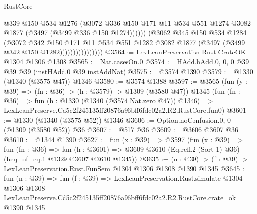\begin{lexlean}{RustCore}
\begin{coremodule}
                                  @339
                                  @150
                                  @534
                                  @1276
                                  (@3072
                                    @336
                                    @150
                                    @171
                                    @11
                                    @534
                                    @551
                                    @1274
                                    @3082
                                    @1877
                                    (@3497 (@3499 @336 @150 @1274))))))
                            (@3062
                              @345
                              @150
                              @534
                              @1284
                              (@3072
                                @342
                                @150
                                @171
                                @11
                                @534
                                @551
                                @1282
                                @3082
                                @1877
                                (@3497 (@3499 @342 @150 @1282))))))))))))))))
@3564 := LexLeanPreservation.Rust.CrateOK @1304 @1306 @1308
@3565 := Nat.casesOn.{0}
@3574 := HAdd.hAdd.{0, 0, 0} @39 @39 @39 (instHAdd.{0} @39 instAddNat)
@3575 := @3574 @1390
@3579 := @1330 (@1340 (@3575 @47)) @1346
@3580 := @3574 @1388
@3597 := @3565
    (fun (y : @39) => (fn : @36) -> (h : @3579) -> @1309 (@3580 @47))
    @1345
    (fun (fn : @36) =>
    fun (h : @1330 (@1340 (@3574 Nat.zero @47)) @1346) =>
    LexLeanPreserve.Cd5c2f245135ff20876a96bff6fdc02a2.R2.RustCore.fun0)
@3601 := @1330 (@1340 (@3575 @52)) @1346
@3606 := Option.noConfusion.{0, 0} (@1309 (@3580 @52)) @36
@3607 := @517 @36
@3609 := @3606 @3607 @36
@3610 := @1344 @1390
@3627 := fun (x : @39) =>
  @3597
    (fun (x : @39) =>
    fun (fn : @36) =>
    fun (h : @3601) =>
    @3609 @3610 (Eq.refl.{2} (Sort 1) @36) (heq_of_eq.{1} @1329 @3607 @3610 @1345))
@3635 := (n : @39) -> (f : @39) -> LexLeanPreservation.Rust.FunSem @1304 @1306 @1308 @1390 @1345
@3645 := fun (n : @39) =>
  fun (f : @39) =>
  LexLeanPreservation.Rust.simulate
    @1304
    @1306
    @1308
    LexLeanPreserve.Cd5c2f245135ff20876a96bff6fdc02a2.R2.RustCore.crate_ok
    @1390
    @1345
\end{coremodule}
\end{lexlean}
